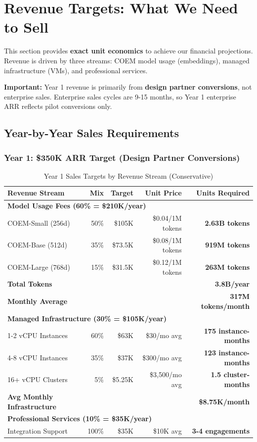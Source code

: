 \section{Revenue Targets: What We Need to Sell}

This section provides \textbf{exact unit economics} to achieve our financial projections. Revenue is driven by three streams: COEM model usage (embeddings), managed infrastructure (VMs), and professional services.

\textbf{Important:} Year 1 revenue is primarily from \textbf{design partner conversions}, not enterprise sales. Enterprise sales cycles are 9-15 months, so Year 1 enterprise ARR reflects pilot conversions only.

\subsection{Year-by-Year Sales Requirements}

\subsubsection{Year 1: \$350K ARR Target (Design Partner Conversions)}

\begin{table}[ht]
\centering
\small
\begin{tabular}{|l|r|r|r|r|}
\hline
\textbf{Revenue Stream} & \textbf{Mix} & \textbf{Target} & \textbf{Unit Price} & \textbf{Units Required} \\
\hline
\multicolumn{5}{|l|}{\textbf{Model Usage Fees (60\% = \$210K/year)}} \\
\hline
COEM-Small (256d) & 50\% & \$105K & \$0.04/1M tokens & \textbf{2.63B tokens} \\
COEM-Base (512d) & 35\% & \$73.5K & \$0.08/1M tokens & \textbf{919M tokens} \\
COEM-Large (768d) & 15\% & \$31.5K & \$0.12/1M tokens & \textbf{263M tokens} \\
\hline
\textbf{Total Tokens} & & & & \textbf{3.8B/year} \\
\textbf{Monthly Average} & & & & \textbf{317M tokens/month} \\
\hline
\multicolumn{5}{|l|}{\textbf{Managed Infrastructure (30\% = \$105K/year)}} \\
\hline
1-2 vCPU Instances & 60\% & \$63K & \$30/mo avg & \textbf{175 instance-months} \\
4-8 vCPU Instances & 35\% & \$37K & \$300/mo avg & \textbf{123 instance-months} \\
16+ vCPU Clusters & 5\% & \$5.25K & \$3,500/mo avg & \textbf{1.5 cluster-months} \\
\hline
\textbf{Avg Monthly Infrastructure} & & & & \textbf{\$8.75K/month} \\
\hline
\multicolumn{5}{|l|}{\textbf{Professional Services (10\% = \$35K/year)}} \\
\hline
Integration Support & 100\% & \$35K & \$10K avg & \textbf{3-4 engagements} \\
\hline
\end{tabular}
\caption{Year 1 Sales Targets by Revenue Stream (Conservative)}
\end{table}

